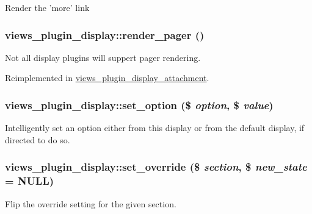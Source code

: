 \label{classviews__plugin__display_ad680ce0ae6e6ed738ab9018f34e05703}
Render the 'more' link \hypertarget{classviews__plugin__display_a0594f29620ea589280dee099666623c3}{
\subsubsection[{render\_\-pager}]{\setlength{\rightskip}{0pt plus 5cm}views\_\-plugin\_\-display::render\_\-pager ()}}
\label{classviews__plugin__display_a0594f29620ea589280dee099666623c3}
Not all display plugins will suppert pager rendering. 

Reimplemented in \hyperlink{classviews__plugin__display__attachment_aecc79a155c6491a0c510568b07c97fb8}{views\_\-plugin\_\-display\_\-attachment}.\hypertarget{classviews__plugin__display_a5a0689b3004e556b51b054062a8467c6}{
\subsubsection[{set\_\-option}]{\setlength{\rightskip}{0pt plus 5cm}views\_\-plugin\_\-display::set\_\-option (\$ {\em option}, \/  \$ {\em value})}}
\label{classviews__plugin__display_a5a0689b3004e556b51b054062a8467c6}
Intelligently set an option either from this display or from the default display, if directed to do so. \hypertarget{classviews__plugin__display_a06eae6326562b974ee8c3c8106a1c130}{
\subsubsection[{set\_\-override}]{\setlength{\rightskip}{0pt plus 5cm}views\_\-plugin\_\-display::set\_\-override (\$ {\em section}, \/  \$ {\em new\_\-state} = {\ttfamily NULL})}}
\label{classviews__plugin__display_a06eae6326562b974ee8c3c8106a1c130}
Flip the override setting for the given section.



